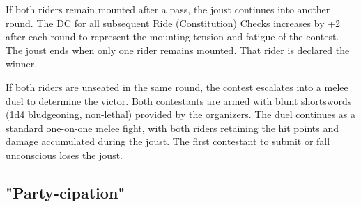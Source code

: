 {If both riders remain mounted after a pass, the joust continues into another round. The DC for all subsequent Ride (Constitution) Checks increases by +2 after each round to represent the mounting tension and fatigue of the contest. The joust ends when only one rider remains mounted. That rider is declared the winner.

If both riders are unseated in the same round, the contest escalates into a melee duel to determine the victor. Both contestants are armed with blunt shortswords (1d4 bludgeoning, non-lethal) provided by the organizers. The duel continues as a standard one-on-one melee fight, with both riders retaining the hit points and damage accumulated during the joust. The first contestant to submit or fall unconscious loses the joust.}

\subsection*{"Party-cipation"}
